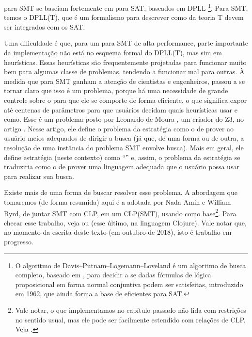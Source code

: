 \documentclass{article}
\begin{document}
 para SMT se baseiam fortemente em 
para SAT, baseados em DPLL \footnote{O algoritmo de
  Davis–Putnam–Logemann–Loveland é um algoritmo de busca completo,
  baseado em , para decidir a se dadas fórmulas
  de lógica proposicional em forma normal conjuntiva podem ser
  satisfeitas, introduzido em 1962, que ainda forma a base de
   eficientes para SAT.}. Para SMT, temos o DPLL(T),
que é um formalismo para descrever como  da teoria
T devem ser integrados com os  SAT.

Uma dificuldade é que, para um  para SMT de alta
performance, parte importante da implementação não está no esquema
formal do DPLL(T), mas sim em heurísticas. Essas heurísticas
são frequentemente projetadas para funcionar muito bem para algumas
classe de problemas, tendendo a funcionar mal para outras. À
medida que  para SMT ganham a atenção de cientistas e
engenheiros, passou a se tornar claro que isso é um problema, porque há
uma necessidade de grande controle sobre o  para que
ele se comporte de forma eficiente, o que 
significa expor até centenas de parâmetros para que usuários
decidam quais heurísticas usar e como. Esse é um problema posto por
Leonardo de Moura , um criador do Z3, no artigo
\cite{moura}. Nesse artigo, ele define o problema da estratégia como o
de prover ao usuário meios adequados de dirigir a busca (já que, de
uma forma ou de outra, a resolução de uma instância do problema SMT
envolve busca). Mais em geral, ele define estratégia (neste contexto)
como ``''\cite{moura} e, assim, o problema da estratégia se
traduziria como o de prover uma linguagem adequada que o usuário possa
usar para realizar sua busca.

Existe mais de uma forma de buscar resolver esse problema. A abordagem
que tomaremos (de forma resumida) aqui é a adotada por Nada Amin e
William Byrd, de juntar SMT com CLP, em um CLP(SMT), usando 
como base\footnote{Vale notar, o que implementamos no capítulo passado
  não lida com restrições no sentido usual, mas ele pode ser
  facilmente estendido com relações de CLP. Veja \cite{alvis}.}. Para
checar esse trabalho, veja \cite{namin} ou
\cite{namim} (esse último, na linguagem Clojure). Vale notar que, no
momento da escrita deste texto (em outubro de 2018), isto é trabalho
em progresso.
\end{document}
